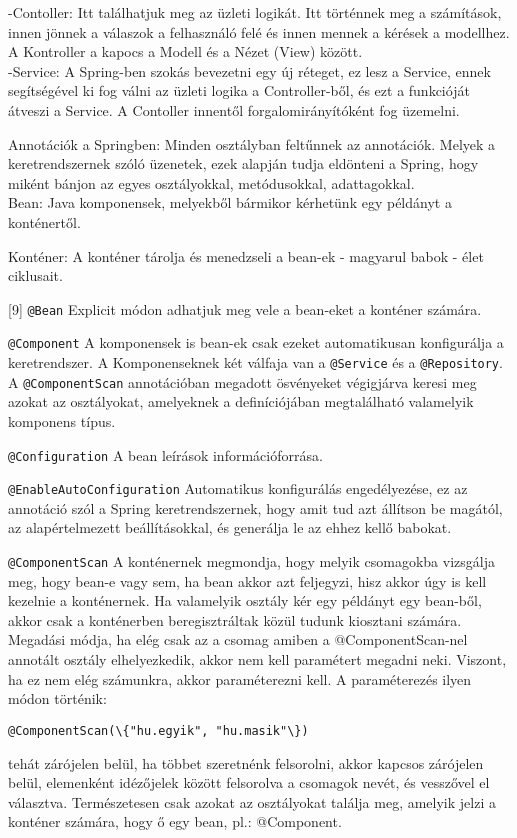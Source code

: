 \documentclass[11pt]{article}
\begin{document}
-Contoller: Itt találhatjuk meg az üzleti logikát. Itt történnek meg a számítások, innen jönnek a válaszok a felhasználó felé és innen mennek a kérések a modellhez. A Kontroller a kapocs a Modell és a Nézet (View) között.\\

-Service: A Spring-ben szokás bevezetni egy új réteget, ez lesz a Service, ennek segítségével ki fog válni az üzleti logika a Controller-ből, és ezt a funkcióját átveszi a Service. A Contoller innentől forgalomirányítóként fog üzemelni.

Annotációk a Springben: Minden osztályban feltűnnek az annotációk. Melyek a keretrendszernek szóló üzenetek, ezek alapján tudja eldönteni a Spring, hogy miként bánjon az egyes osztályokkal, metódusokkal, adattagokkal.\\

Bean: Java komponensek, melyekből bármikor kérhetünk egy példányt a konténertől.

Konténer: A konténer tárolja és menedzseli a bean-ek - magyarul babok - élet ciklusait.

[9] \texttt{@Bean} Explicit módon adhatjuk meg vele a bean-eket a konténer számára.

\texttt{@Component} A komponensek is bean-ek csak ezeket automatikusan konfigurálja a keretrendszer. A Komponenseknek két válfaja van a \texttt{@Service} és a \texttt{@Repository}. A \texttt{@ComponentScan} annotációban megadott ösvényeket végigjárva keresi meg azokat az osztályokat, amelyeknek a definíciójában megtalálható valamelyik komponens típus.

\texttt{@Configuration} A bean leírások információforrása.

\texttt{@EnableAutoConfiguration} Automatikus konfigurálás engedélyezése, ez az annotáció szól a Spring keretrendszernek, hogy amit tud azt állítson be magától, az alapértelmezett beállításokkal, és generálja le az ehhez kellő babokat.

\texttt{@ComponentScan} A konténernek megmondja, hogy melyik csomagokba vizsgálja meg, hogy bean-e vagy sem, ha bean akkor azt feljegyzi, hisz akkor úgy is kell kezelnie  a konténernek. Ha valamelyik osztály kér egy példányt egy bean-ből, akkor csak a konténerben beregisztráltak közül tudunk kiosztani számára. Megadási módja, ha elég csak az a csomag amiben a @ComponentScan-nel annotált osztály elhelyezkedik, akkor nem kell paramétert megadni neki. Viszont, ha ez nem elég számunkra, akkor paraméterezni kell. A paraméterezés ilyen módon történik:
\begin{verbatim}
@ComponentScan(\{"hu.egyik", "hu.masik"\})
\end{verbatim}
tehát zárójelen belül, ha többet szeretnénk felsorolni, akkor kapcsos zárójelen belül, elemenként idézőjelek között felsorolva a csomagok nevét, és vesszővel el választva. Természetesen csak azokat az osztályokat találja meg, amelyik jelzi a konténer számára, hogy ő egy bean, pl.: @Component. \\
\end{document}
